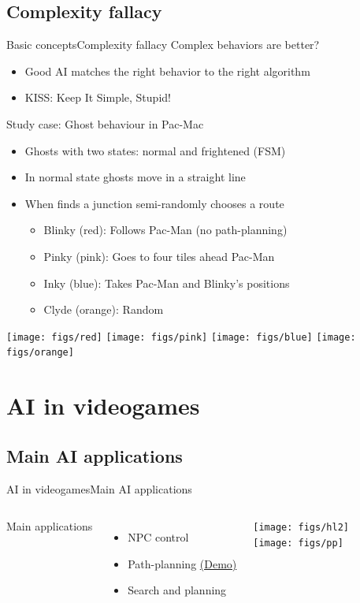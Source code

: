 \documentclass[10pt,compress]{beamer} %
\begin{document}
\subsection{Complexity fallacy}
\begin{frame}{Basic concepts}{Complexity fallacy}
	Complex behaviors are better?
  	\begin{itemize}
		\item Good AI matches the right behavior to the right algorithm
        \item KISS: Keep It Simple, Stupid!
	\end{itemize}
	Study case: Ghost behaviour in Pac-Mac
	\begin{itemize}
		\item Ghosts with two states: normal and frightened (FSM)
		\item In normal state ghosts move in a straight line
		\item When finds a junction semi-randomly chooses a route
		\begin{itemize}
			\item Blinky (red): Follows Pac-Man (no path-planning)
			\item Pinky (pink): Goes to four tiles ahead Pac-Man
			\item Inky (blue): Takes Pac-Man and Blinky's positions
			\item Clyde (orange): Random
		\end{itemize}
	\end{itemize}
	\begin{center}
		\texttt{[image: figs/red]}\hspace{0.5cm}
		\texttt{[image: figs/pink]}\hspace{0.5cm}
		\texttt{[image: figs/blue]}\hspace{0.5cm}
		\texttt{[image: figs/orange]}
	\end{center}
\end{frame}

\section{AI in videogames}
\subsection{Main AI applications}
\begin{frame}{AI in videogames}{Main AI applications}
    \begin{columns}
	\vspace{-0.5cm}
	   Main applications
	   \begin{itemize}
			\item NPC control
			\item Path-planning \href{http://qiao.github.io/PathFinding.js/visual/}{(Demo)}
			\item Search and planning
		\end{itemize}

	\texttt{[image: figs/hl2]}\\
	\texttt{[image: figs/pp]}\\
	\end{columns}
\end{frame}
\end{document}
